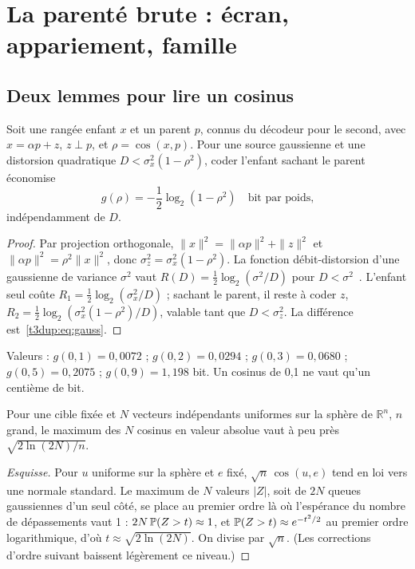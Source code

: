 \section{La parenté brute : écran, appariement, famille}\label{t3dup:sec:parente}

\subsection{Deux lemmes pour lire un cosinus}

\begin{lemme}\label{t3dup:lem:gauss}
Soit une rangée enfant $x$ et un parent $p$, connus du décodeur pour le second, avec $x = \alpha p + z$, $z \perp p$, et $\rho = \cos(x, p)$. Pour une source gaussienne et une distorsion quadratique $D < \sigma_x^2 (1 - \rho^2)$, coder l'enfant sachant le parent économise
\begin{equation}\label{t3dup:eq:gauss}
g(\rho) = -\frac12 \log_2 (1 - \rho^2) \quad \text{bit par poids,}
\end{equation}
indépendamment de $D$.
\end{lemme}

\begin{proof}
Par projection orthogonale, $\|x\|^2 = \|\alpha p\|^2 + \|z\|^2$ et $\|\alpha p\|^2 = \rho^2 \|x\|^2$, donc $\sigma_z^2 = \sigma_x^2 (1 - \rho^2)$. La fonction débit-distorsion d'une gaussienne de variance $\sigma^2$ vaut $R(D) = \frac12 \log_2(\sigma^2/D)$ pour $D < \sigma^2$~\cite{shannon1959}. L'enfant seul coûte $R_1 = \frac12\log_2(\sigma_x^2/D)$ ; sachant le parent, il reste à coder $z$, $R_2 = \frac12\log_2(\sigma_x^2(1-\rho^2)/D)$, valable tant que $D < \sigma_z^2$. La différence est~\eqref{t3dup:eq:gauss}.
\end{proof}

Valeurs \calc : $g(0{,}1) = 0{,}0072$ ; $g(0{,}2) = 0{,}0294$ ; $g(0{,}3) = 0{,}0680$ ; $g(0{,}5) = 0{,}2075$ ; $g(0{,}9) = 1{,}198$ bit. Un cosinus de 0,1 ne vaut qu'un centième de bit.

\begin{lemme}\label{t3dup:lem:hasard}
Pour une cible fixée et $N$ vecteurs indépendants uniformes sur la sphère de $\mathbb{R}^n$, $n$ grand, le maximum des $N$ cosinus en valeur absolue vaut à peu près $\sqrt{2\ln(2N)/n}$.
\end{lemme}

\begin{proof}[Esquisse]
Pour $u$ uniforme sur la sphère et $e$ fixé, $\sqrt n\,\cos(u, e)$ tend en loi vers une normale standard. Le maximum de $N$ valeurs $|Z|$, soit de $2N$ queues gaussiennes d'un seul côté, se place au premier ordre là où l'espérance du nombre de dépassements vaut 1 : $2N\,\mathbb{P}(Z > t) \approx 1$, et $\mathbb{P}(Z > t) \approx e^{-t^2/2}$ au premier ordre logarithmique, d'où $t \approx \sqrt{2\ln(2N)}$. On divise par $\sqrt n$. (Les corrections d'ordre suivant baissent légèrement ce niveau.)
\end{proof}

